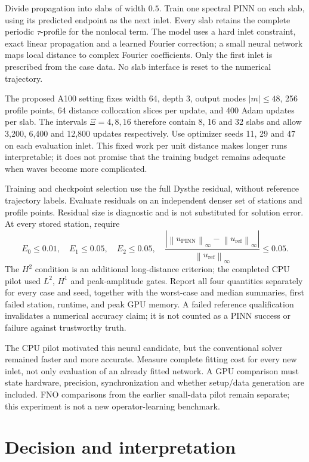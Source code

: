 \documentclass[11pt]{article}
\newcommand{\norm}[1]{\left\lVert #1\right\rVert}
\begin{document}
Divide propagation into slabs of width \(0.5\). Train one spectral PINN on
each slab, using its predicted endpoint as the next inlet. Every slab retains
the complete periodic \(\tau\)-profile for the nonlocal term. The model uses
a hard inlet constraint, exact linear propagation and a learned Fourier
correction; a small neural network maps local distance to complex Fourier
coefficients. Only the first inlet is prescribed from the case data. No slab
interface is reset to the numerical trajectory.

The proposed A100 setting fixes width 64, depth 3, output modes
\(|m|\leq48\), 256 profile points, 64 distance collocation slices per update,
and 400 Adam updates per slab. The intervals \(\Xi=4,8,16\) therefore contain
8, 16 and 32 slabs and allow 3,200, 6,400 and 12,800 updates respectively.
Use optimizer seeds 11, 29 and 47 on each evaluation inlet. This fixed work
per unit distance makes longer runs interpretable; it does not promise that
the training budget remains adequate when waves become more complicated.

Training and checkpoint selection use the full Dysthe residual, without
reference trajectory labels. Evaluate residuals on an independent denser
set of stations and profile points. Residual size is diagnostic and is not
substituted for solution error. At every stored station, require
\[
E_0\leq0.01,\quad E_1\leq0.05,\quad E_2\leq0.05,\quad
\frac{|\norm{u_{\mathrm{PINN}}}_\infty-
         \norm{u_{\mathrm{ref}}}_\infty|}
        {\norm{u_{\mathrm{ref}}}_\infty}\leq0.05.
\]
The \(H^2\) condition is an additional long-distance criterion; the completed
CPU pilot used \(L^2\), \(H^1\) and peak-amplitude gates. Report all four
quantities separately for every case and seed, together with
the worst-case and median summaries, first failed station, runtime, and peak
GPU memory. A failed reference qualification invalidates a numerical accuracy
claim; it is not counted as a PINN success or failure against trustworthy truth.

The CPU pilot motivated this neural candidate, but the conventional solver
remained faster and more accurate. Measure complete fitting cost for every
new inlet, not only evaluation of an already fitted network. A GPU comparison
must state hardware, precision, synchronization and whether setup/data
generation are included. FNO comparisons from the earlier small-data pilot
remain separate; this experiment is not a new operator-learning benchmark.

\section{Decision and interpretation}
\end{document}
